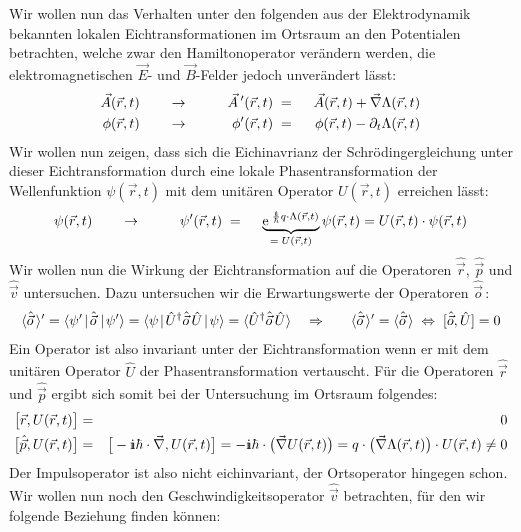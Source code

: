 Wir wollen nun das Verhalten unter den folgenden aus der Elektrodynamik bekannten lokalen Eichtransformationen im Ortsraum an den Potentialen betrachten, welche zwar den Hamiltonoperator verändern werden, die elektromagnetischen $\vec{E}$- und $\vec{B}$-Felder jedoch unverändert lässt:
\begin{alignat*}{4}
	\vec{A}(\vec{r},t) &\qquad\to\qquad& \vec{A}\,'(\vec{r},t) &\;=\;\;& \vec{A}(\vec{r},t) + \vec{\nabla}\Lambda(\vec{r},t)
	\\
	\phi(\vec{r},t) &\qquad\to\qquad& \phi'(\vec{r},t) &\;=\;\;& \phi(\vec{r},t) - \partial_t\Lambda(\vec{r},t)
\end{alignat*}
Wir wollen nun zeigen, dass sich die Eichinavrianz der Schrödingergleichung unter dieser Eichtransformation durch eine lokale Phasentransformation der Wellenfunktion $\psi(\vec{r},t)$ mit dem unitären Operator $U(\vec{r},t)$ erreichen lässt: 
\begin{alignat*}{4}
	\psi(\vec{r},t) &\qquad\to\qquad& \psi'(\vec r,t) &\;=\;\;& \underbrace{\e^{\;\frac{\I}{\hbar}q\cdot \Lambda(\vec{r},t)}}_{=\;U(\vec{r},t)} \psi(\vec{r},t) = U(\vec{r},t)\cdot\psi(\vec{r},t)
\end{alignat*}
Wir wollen nun die Wirkung der Eichtransformation auf die Operatoren $\hat{\vec{r}}$, $\hat{\vec{p}}$ und $\hat{\vec{v}}$ untersuchen. Dazu untersuchen wir die Erwartungswerte der Operatoren $\hat{\vec{o}}\,$: 
\begin{eqnarray*}
	\EW{\hat{\vec{o}}\,}'=\bracket{\psi'}{\hat{\vec{o}}\,}{\psi'}=\bracket{\psi}{\hat{U}^{\dagger}\hat{\vec{o}}\,\hat{U}}{\psi}=\EW{\hat{U}^{\dagger}\hat{\vec{o}}\,\hat{U}} &\quad\Rightarrow\quad& \EW{\hat{\vec{o}}\,}'=\EW{\hat{\vec{o}}\,}\;\Leftrightarrow\;[\hat{\vec{o}},\hat{U}]=0
\end{eqnarray*}
Ein Operator ist also invariant unter der Eichtransformation wenn er mit dem unitären Operator $\hat{U}$ der Phasentransformation vertauscht. Für die Operatoren $\hat{\vec{r}}$ und $\hat{\vec{p}}$ ergibt sich somit bei der Untersuchung im Ortsraum folgendes: 
\begin{eqnarray*}
	\big[\vec{r},U(\vec{r},t)\big] &=& 0  
	\\
	\big[\hat{\vec{p}},U(\vec{r},t)\big] &=& \big[-\I\hbar\cdot\vec{\nabla},U(\vec{r},t)\big] = -\I\hbar\cdot\big(\vec{\nabla}U(\vec{r},t)\big) = q\cdot\big(\vec{\nabla}\Lambda(\vec{r},t)\big)\cdot U(\vec{r},t) \neq 0
\end{eqnarray*}
Der Impulsoperator ist also nicht eichinvariant, der Ortsoperator hingegen schon. Wir wollen nun noch den Geschwindigkeitsoperator $\hat{\vec{v}}$ betrachten, für den wir folgende Beziehung finden können: 
